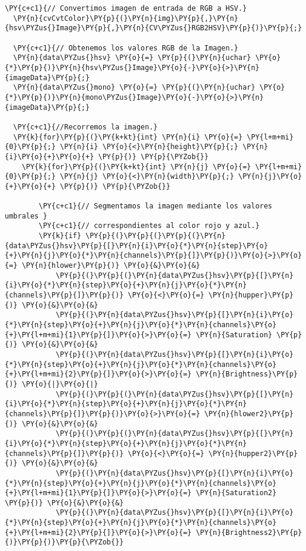\begin{Verbatim}[commandchars=\\\{\}]
  \PY{c+c1}{// Convertimos imagen de entrada de RGB a HSV.}
  \PY{n}{cvCvtColor}\PY{p}{(}\PY{n}{img}\PY{p}{,}\PY{n}{hsv\PYZus{}Image}\PY{p}{,}\PY{n}{CV\PYZus{}RGB2HSV}\PY{p}{)}\PY{p}{;}

  \PY{c+c1}{// Obtenemos los valores RGB de la Imagen.}
  \PY{n}{data\PYZus{}hsv} \PY{o}{=} \PY{p}{(}\PY{n}{uchar} \PY{o}{*}\PY{p}{)}\PY{n}{hsv\PYZus{}Image}\PY{o}{-}\PY{o}{>}\PY{n}{imageData}\PY{p}{;}
  \PY{n}{data\PYZus{}mono} \PY{o}{=} \PY{p}{(}\PY{n}{uchar} \PY{o}{*}\PY{p}{)}\PY{n}{mono\PYZus{}Image}\PY{o}{-}\PY{o}{>}\PY{n}{imageData}\PY{p}{;}

  \PY{c+c1}{//Recorremos la imagen.}
  \PY{k}{for}\PY{p}{(}\PY{k+kt}{int} \PY{n}{i} \PY{o}{=} \PY{l+m+mi}{0}\PY{p}{;} \PY{n}{i} \PY{o}{<}\PY{n}{height}\PY{p}{;} \PY{n}{i}\PY{o}{+}\PY{o}{+} \PY{p}{)} \PY{p}{\PYZob{}}
    \PY{k}{for}\PY{p}{(}\PY{k+kt}{int} \PY{n}{j} \PY{o}{=} \PY{l+m+mi}{0}\PY{p}{;} \PY{n}{j} \PY{o}{<}\PY{n}{width}\PY{p}{;} \PY{n}{j}\PY{o}{+}\PY{o}{+} \PY{p}{)} \PY{p}{\PYZob{}}

        \PY{c+c1}{// Segmentamos la imagen mediante los valores umbrales }
        \PY{c+c1}{// correspondientes al color rojo y azul.}
        \PY{k}{if} \PY{p}{(}\PY{p}{(}\PY{p}{(}\PY{n}{data\PYZus{}hsv}\PY{p}{[}\PY{n}{i}\PY{o}{*}\PY{n}{step}\PY{o}{+}\PY{n}{j}\PY{o}{*}\PY{n}{channels}\PY{p}{]}\PY{p}{)}\PY{o}{>}\PY{o}{=} \PY{n}{hlower}\PY{p}{)} \PY{o}{&}\PY{o}{&}
            \PY{p}{(}\PY{p}{(}\PY{n}{data\PYZus{}hsv}\PY{p}{[}\PY{n}{i}\PY{o}{*}\PY{n}{step}\PY{o}{+}\PY{n}{j}\PY{o}{*}\PY{n}{channels}\PY{p}{]}\PY{p}{)} \PY{o}{<}\PY{o}{=} \PY{n}{hupper}\PY{p}{)} \PY{o}{&}\PY{o}{&} 
            \PY{p}{(}\PY{n}{data\PYZus{}hsv}\PY{p}{[}\PY{n}{i}\PY{o}{*}\PY{n}{step}\PY{o}{+}\PY{n}{j}\PY{o}{*}\PY{n}{channels}\PY{o}{+}\PY{l+m+mi}{1}\PY{p}{]}\PY{o}{>}\PY{o}{=} \PY{n}{Saturation} \PY{p}{)} \PY{o}{&}\PY{o}{&} 
            \PY{p}{(}\PY{n}{data\PYZus{}hsv}\PY{p}{[}\PY{n}{i}\PY{o}{*}\PY{n}{step}\PY{o}{+}\PY{n}{j}\PY{o}{*}\PY{n}{channels}\PY{o}{+}\PY{l+m+mi}{2}\PY{p}{]}\PY{o}{>}\PY{o}{=} \PY{n}{Brightness}\PY{p}{)} \PY{o}{|}\PY{o}{|} 
            \PY{p}{(}\PY{p}{(}\PY{n}{data\PYZus{}hsv}\PY{p}{[}\PY{n}{i}\PY{o}{*}\PY{n}{step}\PY{o}{+}\PY{n}{j}\PY{o}{*}\PY{n}{channels}\PY{p}{]}\PY{p}{)}\PY{o}{>}\PY{o}{=} \PY{n}{hlower2}\PY{p}{)} \PY{o}{&}\PY{o}{&}
            \PY{p}{(}\PY{p}{(}\PY{n}{data\PYZus{}hsv}\PY{p}{[}\PY{n}{i}\PY{o}{*}\PY{n}{step}\PY{o}{+}\PY{n}{j}\PY{o}{*}\PY{n}{channels}\PY{p}{]}\PY{p}{)} \PY{o}{<}\PY{o}{=} \PY{n}{hupper2}\PY{p}{)} \PY{o}{&}\PY{o}{&} 
            \PY{p}{(}\PY{n}{data\PYZus{}hsv}\PY{p}{[}\PY{n}{i}\PY{o}{*}\PY{n}{step}\PY{o}{+}\PY{n}{j}\PY{o}{*}\PY{n}{channels}\PY{o}{+}\PY{l+m+mi}{1}\PY{p}{]}\PY{o}{>}\PY{o}{=} \PY{n}{Saturation2} \PY{p}{)} \PY{o}{&}\PY{o}{&} 
            \PY{p}{(}\PY{n}{data\PYZus{}hsv}\PY{p}{[}\PY{n}{i}\PY{o}{*}\PY{n}{step}\PY{o}{+}\PY{n}{j}\PY{o}{*}\PY{n}{channels}\PY{o}{+}\PY{l+m+mi}{2}\PY{p}{]}\PY{o}{>}\PY{o}{=} \PY{n}{Brightness2}\PY{p}{)}\PY{p}{)}\PY{p}{\PYZob{}}


\end{Verbatim}
